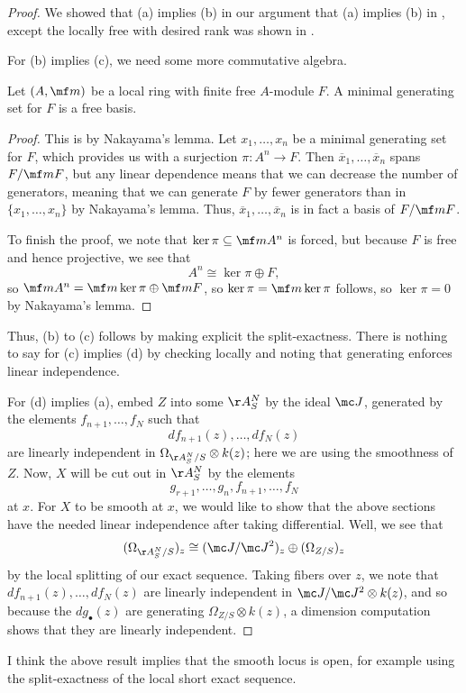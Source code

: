 \documentclass[../notes.tex]{subfiles}
\begin{document}
\begin{proof}
	We showed that (a) implies (b) in our argument that (a) implies (b) in , except the locally free with desired rank was shown in .

	For (b) implies (c), we need some more commutative algebra.
	\begin{lemma}
		Let $(A,\mf m)$ be a local ring with finite free $A$-module $F$. A minimal generating set for $F$ is a free basis.
	\end{lemma}
	\begin{proof}
		This is by Nakayama's lemma. Let $x_1,\ldots,x_n$ be a minimal generating set for $F$, which provides us with a surjection $\pi\colon A^n\to F$. Then $\overline x_1,\ldots,\overline x_n$ spans $F/\mf mF$, but any linear dependence means that we can decrease the number of generators, meaning that we can generate $F$ by fewer generators than in $\{x_1,\ldots,x_n\}$ by Nakayama's lemma. Thus, $\overline x_1,\ldots,\overline x_n$ is in fact a basis of $F/\mf mF$.

		To finish the proof, we note that $\ker\pi\subseteq\mf mA^n$ is forced, but because $F$ is free and hence projective, we see that
		\[A^n\cong\ker\pi\oplus F,\]
		so $\mf mA^n=\mf m\ker\pi\oplus\mf mF$, so $\ker\pi=\mf m\ker\pi$ follows, so $\ker\pi=0$ by Nakayama's lemma.
	\end{proof}
	Thus, (b) to (c) follows by making explicit the split-exactness. There is nothing to say for (c) implies (d) by checking locally and noting that generating enforces linear independence.

	For (d) implies (a), embed $Z$ into some $\AA^N_S$ by the ideal $\mc J$, generated by the elements $f_{n+1},\ldots,f_N$ such that
	\[df_{n+1}(z),\ldots,df_N(z)\]
	are linearly independent in $\Omega_{\AA^N_S/S}\otimes k(z)$; here we are using the smoothness of $Z$. Now, $X$ will be cut out in $\AA^N_S$ by the elements
	\[g_{r+1},\ldots,g_n,f_{n+1},\ldots,f_N\]
	at $x$. For $X$ to be smooth at $x$, we would like to show that the above sections have the needed linear independence after taking differential. Well, we see that
	\[(\Omega_{\AA^N_S/S})_z\cong(\mc J/\mc J^2)_z\oplus(\Omega_{Z/S})_z\]
	by the local splitting of our exact sequence. Taking fibers over $z$, we note that $df_{n+1}(z),\ldots,df_N(z)$ are linearly independent in $\mc J/\mc J^2\otimes k(z)$, and so because the $dg_\bullet(z)$ are generating $\Omega_{Z/S}\otimes k(z)$, a dimension computation shows that they are linearly independent.
\end{proof}
\begin{remark}
	I think the above result implies that the smooth locus is open, for example using the split-exactness of the local short exact sequence.
\end{remark}
\end{document}
